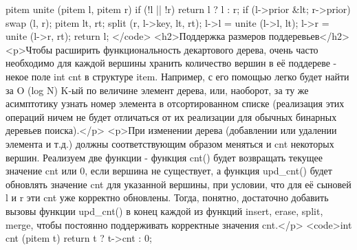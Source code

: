 pitem unite (pitem l, pitem r) {
	if (!l || !r)  return l ? l : r;
	if (l->prior &lt; r->prior)  swap (l, r);
	pitem lt, rt;
	split (r, l->key, lt, rt);
	l->l = unite (l->l, lt);
	l->r = unite (l->r, rt);
	return l;
}</code>
<h2>Поддержка размеров поддеревьев</h2>
<p>Чтобы расширить функциональность декартового дерева, очень часто необходимо для каждой вершины хранить количество вершин в её поддереве - некое поле int cnt в структуре item. Например, с его помощью легко будет найти за O (log N) K-ый по величине элемент дерева, или, наоборот, за ту же асимптотику узнать номер элемента в отсортированном списке (реализация этих операций ничем не будет отличаться от их реализации для обычных бинарных деревьев поиска).</p>
<p>При изменении дерева (добавлении или удалении элемента и т.д.) должны соответствующим образом меняться и cnt некоторых вершин. Реализуем две функции - функция cnt() будет возвращать текущее значение cnt или 0, если вершина не существует, а функция upd_cnt() будет обновлять значение cnt для указанной вершины, при условии, что для её сыновей l и r эти cnt уже корректно обновлены. Тогда, понятно, достаточно добавить вызовы функции upd_cnt() в конец каждой из функций insert, erase, split, merge, чтобы постоянно поддерживать корректные значения cnt.</p>
<code>int cnt (pitem t) {
	return t ? t->cnt : 0;
}

